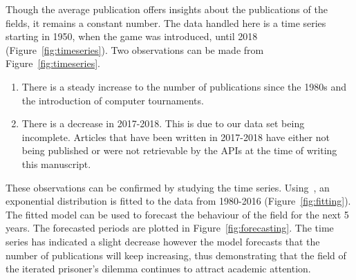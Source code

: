 \documentclass{article}
\theoremstyle{definition}
\begin{document}
Though the average publication offers insights about the publications of the
fields, it remains a constant number. The data handled here is a time
series starting in 1950, when the game was introduced, until 2018 (Figure~\ref{fig:timeseries}). 
Two observations can be made from Figure~\ref{fig:timeseries}.

\begin{enumerate}
    \item There is a steady increase to the number of publications since the
    1980s and the introduction of computer tournaments.
    \item There is a decrease in 2017-2018. This is due to our data set being
    incomplete. Articles that have been written in 2017-2018 have either not
    being published or were not retrievable by the APIs at the time of writing
    this manuscript.
\end{enumerate}

These observations can be confirmed by studying the time series.
Using~\cite{scipy}, an exponential distribution is fitted to the data from
1980-2016 (Figure~\ref{fig:fitting}).
The fitted model can be used to forecast the behaviour of the field for the
next 5 years. The forecasted periods are plotted in
Figure~\ref{fig:forecasting}. The time series has indicated a slight decrease
however the model forecasts that the number of publications will keep
increasing, thus demonstrating that the field of the iterated prisoner's dilemma
continues to attract academic attention.
\end{document}
